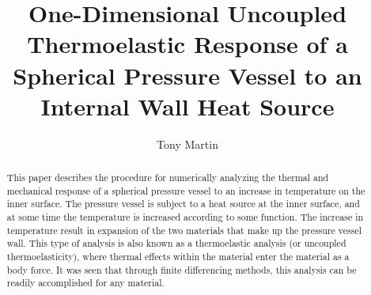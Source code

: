 \documentclass[times]{nmeauth}
\begin{document}

\title{One-Dimensional Uncoupled Thermoelastic Response of a Spherical Pressure Vessel to an Internal Wall Heat Source}
\author{Tony Martin\corrauth{}}

\address{John Wiley \& Sons, Ltd, The Atrium, Southern Gate, Chichester,
West Sussex, PO19~8SQ, UK}


\begin{abstract}
This paper describes the procedure for numerically analyzing the thermal and mechanical response of a spherical pressure vessel to an increase in temperature on the inner surface. The pressure vessel is subject to a heat source at the inner surface, and at some time the temperature is increased according to some function. The increase in temperature result in expansion of the two materials that make up the pressure vessel wall. This type of analysis is also known as a thermoelastic analysis (or uncoupled thermoelasticity), where thermal effects within the material enter the material as a body force. It was seen that through finite differencing methods, this analysis can be readily accomplished for any material.  
\end{abstract}


\maketitle


\vspace{-6pt}
\end{document}

